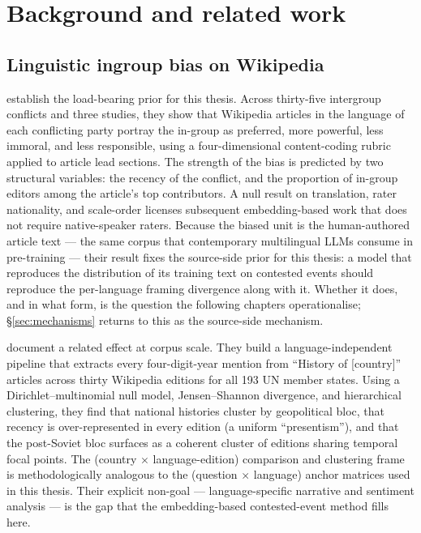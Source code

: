 \chapter{Background and related work}\label{ch:background}

\section{Linguistic ingroup bias on Wikipedia}\label{sec:wikipedia_bias}

\citet{oeberst2020wikipedia} establish the load-bearing prior for this
thesis. Across thirty-five intergroup conflicts and three studies, they
show that Wikipedia articles in the language of each conflicting party
portray the in-group as preferred, more powerful, less immoral, and less
responsible, using a four-dimensional content-coding rubric applied to
article lead sections. The strength of the bias is predicted by two
structural variables: the recency of the conflict, and the proportion of
in-group editors among the article's top contributors. A null result on
translation, rater nationality, and scale-order licenses subsequent
embedding-based work that does not require native-speaker raters.
Because the biased unit is the human-authored article text --- the
same corpus that contemporary multilingual LLMs consume in
pre-training --- their result fixes the source-side prior for this
thesis: a model that reproduces the distribution of its training text
on contested events should reproduce the per-language framing
divergence along with it. Whether it does, and in what form, is the
question the following chapters operationalise;
\S\ref{sec:mechanisms} returns to this as the source-side mechanism.

\citet{samoilenko2017timelines} document a related effect at corpus
scale. They build a language-independent pipeline that extracts every
four-digit-year mention from ``History of [country]'' articles across
thirty Wikipedia editions for all 193 UN member states. Using a
Dirichlet--multinomial null model, Jensen--Shannon divergence, and
hierarchical clustering, they find that national histories cluster by
geopolitical bloc, that recency is over-represented in every edition (a
uniform ``presentism''), and that the post-Soviet bloc surfaces as a
coherent cluster of editions sharing temporal focal points. The
(country $\times$ language-edition) comparison and clustering frame is
methodologically analogous to the (question $\times$ language) anchor
matrices used in this thesis. Their explicit non-goal --- language-specific
narrative and sentiment analysis --- is the gap that the embedding-based
contested-event method fills here.


